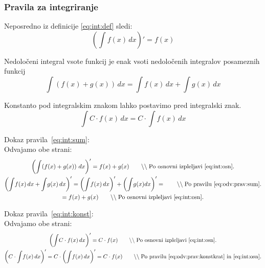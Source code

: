 \documentclass[a4paper,oneside,12pt,fleqn]{article}
\newcommand\krat\cdot
\newcommand{\comment}[1]{\ensuremath{\qquad\backslash\backslash\;}\textnormal{#1}}
\renewcommand{\d}{\ensuremath{\,d}} %
\newcommand{\dx}{\ensuremath{\d x}}
\numberwithin{equation}{section}
\begin{document}
\subsubsection{Pravila za integriranje}
\label{sec:int:prav}
Neposredno iz definicije \eqref{eq:int:def} sledi:
\begin{equation}
  \left( \int\!f(x)\dx \right)' = f(x) \label{eq:int:osn}
\end{equation}

Nedoločeni integral vsote funkcij je enak vsoti nedoločenih integralov posameznih funkcij
\begin{equation}
  \int\!\left( f(x) + g(x) \right)\dx = \int\!f(x)\dx + \int\!g(x)\dx \label{eq:int:sum}
\end{equation}

Konstanto pod integralskim znakom lahko postavimo pred integralski znak.
\begin{equation}
  \int\!C\krat f(x)\dx = C\krat \int\!f(x)\dx \label{eq:int:konst}
\end{equation}

Dokaz pravila~\eqref{eq:int:sum}: \\
Odvajamo obe strani:
\begin{gather*}
  \left( \int\!\left( f(x) + g(x) \right)\dx\right)' = f(x) + g(x) \comment{Po osnovni izpleljavi~\eqref{eq:int:osn}.} \\
  \left( \int\!f(x)\dx + \int\!g(x)\dx \right)' = \left( \int\!f(x)\dx \right)' + \left( \int\!g(x)dx \right)' = \comment{Po pravilu~\eqref{eq:odv:prav:sum}.} \\ 
  = f(x) + g(x) \comment{Po osnovni izpleljavi~\eqref{eq:int:osn}.} 
\end{gather*}

Dokaz pravila~\eqref{eq:int:konst}: \\
Odvajamo obe strani:
\begin{gather*}
  \left( \int\!C\krat f(x)\dx \right)' = C\krat f(x) \comment{Po osnovni izpleljavi~\eqref{eq:int:osn}.} \\
  \left( C\krat \int\!f(x)\dx \right)' = C\krat \left( \int\!f(x)\dx \right)' = C \krat f(x) \comment{Po pravilu~\eqref{eq:odv:prav:konstkrat} in~\eqref{eq:int:osn}.}
\end{gather*}
\end{document}
